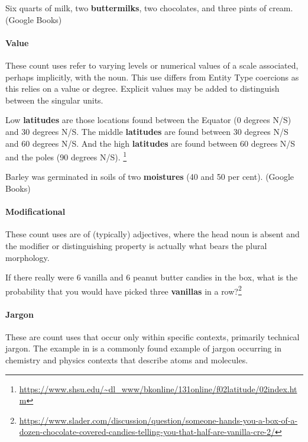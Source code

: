\documentclass[output=paper]{langscibook}
\begin{document}
\eanoraggedright \label{gri-ric:ex:buttermilks}
Six quarts of milk, two \textbf{buttermilks}, two chocolates, and three pints of cream. \hfill (Google Books)
\z


\paragraph*{Value} These count uses refer to varying levels or numerical values of a scale associated, perhaps implicitly, with the noun. This use differs from Entity Type coercions as this relies on a value or degree. Explicit values may be added to distinguish between the singular units.

\eanoraggedright \label{gri-ric:ex:latitudes} Low \textbf{latitudes} are those locations found between the Equator (0 degrees N/S) and 30 degrees N/S. The middle \textbf{latitudes} are found between 30 degrees N/S and 60 degrees N/S. And the high \textbf{latitudes} are found between 60 degrees N/S and the poles (90 degrees N/S). \footnote{\url{https://www.shsu.edu/~dl_www/bkonline/131online/f02latitude/02index.htm}} \z

\eanoraggedright \label{gri-ric:ex:moistures} Barley was germinated in soils of two \textbf{moistures} (40 and 50 per cent). \hfill (Google Books) \z


\paragraph*{Modificational} These count uses are of (typically) adjectives, where the head noun is absent and the modifier or distinguishing property is actually what bears the plural morphology.

\eanoraggedright \label{gri-ric:ex:vanillas} If there really were 6 vanilla and 6 peanut butter candies in the box, what is the probability that you would have picked three \textbf{vanillas} in a row?\footnote{\url{https://www.slader.com/discussion/question/someone-hands-you-a-box-of-a-dozen-chocolate-covered-candies-telling-you-that-half-are-vanilla-cre-2/}} \z


\paragraph*{Jargon} These are count uses that  occur only within specific contexts, primarily technical jargon. The example in  is a commonly found example of jargon occurring in chemistry and physics contexts that describe atoms and molecules.
\end{document}
